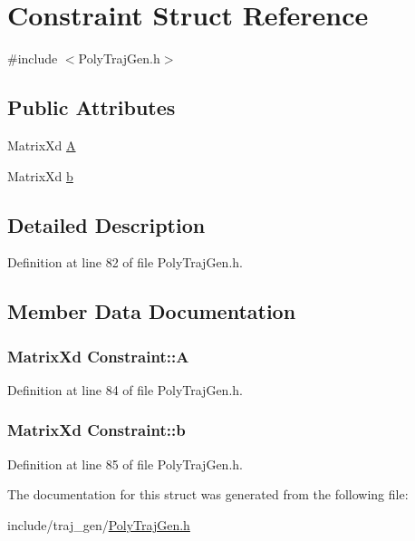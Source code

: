 \hypertarget{struct_constraint}{}\section{Constraint Struct Reference}
\label{struct_constraint}


{\ttfamily \#include $<$Poly\+Traj\+Gen.\+h$>$}

\subsection*{Public Attributes}
\begin{DoxyCompactItemize}
\item 
Matrix\+Xd \hyperlink{struct_constraint_a95639f38cb8a18c60a96e629160a9571}{A}
\item 
Matrix\+Xd \hyperlink{struct_constraint_ab22b0463922cee8c89b0443ed611d072}{b}
\end{DoxyCompactItemize}


\subsection{Detailed Description}


Definition at line 82 of file Poly\+Traj\+Gen.\+h.



\subsection{Member Data Documentation}
\subsubsection[{\texorpdfstring{A}{A}}]{\setlength{\rightskip}{0pt plus 5cm}Matrix\+Xd Constraint\+::A}\hypertarget{struct_constraint_a95639f38cb8a18c60a96e629160a9571}{}\label{struct_constraint_a95639f38cb8a18c60a96e629160a9571}


Definition at line 84 of file Poly\+Traj\+Gen.\+h.

\subsubsection[{\texorpdfstring{b}{b}}]{\setlength{\rightskip}{0pt plus 5cm}Matrix\+Xd Constraint\+::b}\hypertarget{struct_constraint_ab22b0463922cee8c89b0443ed611d072}{}\label{struct_constraint_ab22b0463922cee8c89b0443ed611d072}


Definition at line 85 of file Poly\+Traj\+Gen.\+h.



The documentation for this struct was generated from the following file\+:\begin{DoxyCompactItemize}
\item 
include/traj\+\_\+gen/\hyperlink{_poly_traj_gen_8h}{Poly\+Traj\+Gen.\+h}\end{DoxyCompactItemize}
